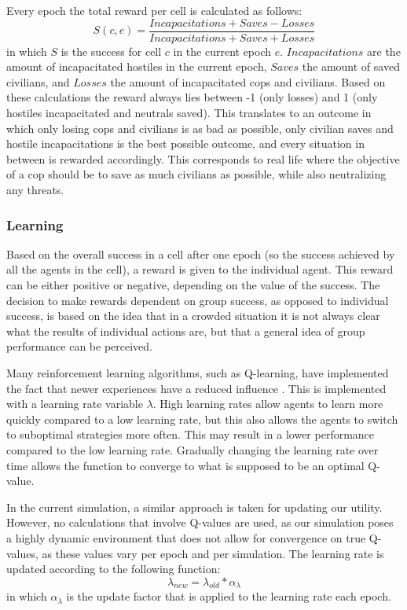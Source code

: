 Every epoch the total reward per cell is calculated as follows:
\begin{equation} \label{eq:reward}
S(c, e) = \frac{Incapacitations + Saves - Losses}{Incapacitations + Saves + Losses}
\end{equation}
in which $S$ is the success for cell $c$ in the current epoch $e$. $Incapacitations$ are the amount of incapacitated hostiles in the current epoch, $Saves$ the amount of saved civilians, and $Losses$ the amount of incapacitated cops and civilians.
Based on these calculations the reward always lies between -1 (only losses) and 1 (only hostiles incapacitated and neutrals saved).
This translates to an outcome in which only losing cops and civilians is as bad as possible,
only civilian saves and hostile incapacitations is the best possible outcome,
and every situation in between is rewarded accordingly.
This corresponds to real life where the objective of a cop should be to save as much civilians as possible, 
while also neutralizing any threats.

\subsubsection{Learning}
Based on the overall success in a cell after one epoch (so the success achieved by all the agents in the cell), a reward is given to the individual agent.
This reward can be either positive or negative, depending on the value of the success.
The decision to make rewards dependent on group success, as opposed to individual success, is based on the idea that in a crowded situation it is not always clear what the results of individual actions are, but that a general idea of group performance can be perceived.

Many reinforcement learning algorithms, such as Q-learning, have implemented the fact that newer experiences have a reduced influence  \citep*{watkins1992q}.
This is implemented with a learning rate variable $\lambda$.
High learning rates allow agents to learn more quickly compared to a low learning rate, but this also allows the agents to switch to suboptimal strategies more often.
This may result in a lower performance compared to the low learning rate.
Gradually changing the learning rate over time allows the function to converge to what is supposed to be an optimal Q-value.

In the current simulation, a similar approach is taken for updating our utility.
However, no calculations that involve Q-values are used,
as our simulation poses a highly dynamic environment that does not allow for convergence on true Q-values,
as these values vary per epoch and per simulation.
The learning rate is updated according to the following function:
\begin{equation} \label{eq:lambda}
\lambda_{new} = \lambda_{old} * \alpha_{\lambda}
\end{equation}
in which $\alpha_\lambda$ is the update factor that is applied to the learning rate each epoch.

